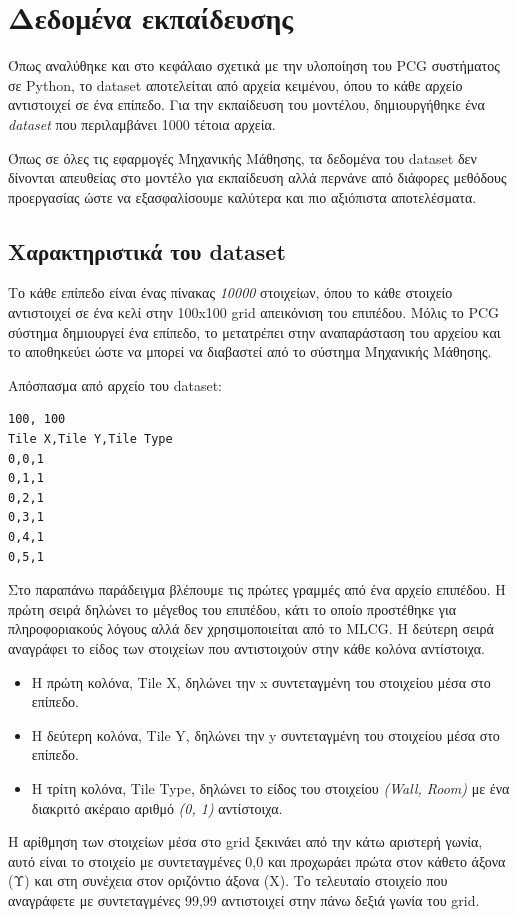 \section{Δεδομένα εκπαίδευσης}
Όπως αναλύθηκε και στο κεφάλαιο σχετικά με την υλοποίηση του PCG συστήματος σε Python, το dataset αποτελείται από αρχεία κειμένου, όπου το κάθε αρχείο αντιστοιχεί σε ένα επίπεδο. Για την εκπαίδευση του μοντέλου, δημιουργήθηκε ένα \textit{dataset} που περιλαμβάνει 1000 τέτοια αρχεία.
\par
Όπως σε όλες τις εφαρμογές Μηχανικής Μάθησης, τα δεδομένα του dataset δεν δίνονται απευθείας στο μοντέλο για εκπαίδευση αλλά περνάνε από διάφορες μεθόδους προεργασίας ώστε να εξασφαλίσουμε καλύτερα και πιο αξιόπιστα αποτελέσματα.


\subsection{Χαρακτηριστικά του dataset}
Το κάθε επίπεδο είναι ένας πίνακας \textit{10000} στοιχείων, όπου το κάθε στοιχείο αντιστοιχεί σε ένα κελί στην 100x100 grid απεικόνιση του επιπέδου. Μόλις το PCG σύστημα δημιουργεί ένα επίπεδο, το μετατρέπει στην αναπαράσταση του αρχείου και το αποθηκεύει ώστε να μπορεί να διαβαστεί από το σύστημα Μηχανικής Μάθησης.
\par
Απόσπασμα από αρχείο του dataset:
\begin{verbatim}
100, 100
Tile X,Tile Y,Tile Type
0,0,1
0,1,1
0,2,1
0,3,1
0,4,1
0,5,1
\end{verbatim}
Στο παραπάνω παράδειγμα βλέπουμε τις πρώτες γραμμές από ένα αρχείο επιπέδου. Η πρώτη σειρά δηλώνει το μέγεθος του επιπέδου, κάτι το οποίο προστέθηκε για πληροφοριακούς λόγους αλλά δεν χρησιμοποιείται από το MLCG. Η δεύτερη σειρά αναγράφει το είδος των στοιχείων που αντιστοιχούν στην κάθε κολόνα αντίστοιχα.
\par

\begin{itemize}
\item Η πρώτη κολόνα, Tile X, δηλώνει την x συντεταγμένη του στοιχείου μέσα στο επίπεδο.
\item Η δεύτερη κολόνα, Tile Y, δηλώνει την y συντεταγμένη του στοιχείου μέσα στο επίπεδο.
\item Η τρίτη κολόνα, Tile Type, δηλώνει το είδος του στοιχείου \textit{(Wall, Room)} με ένα διακριτό ακέραιο αριθμό \textit{(0, 1)} αντίστοιχα.
\end{itemize}

\par
H αρίθμηση των στοιχείων μέσα στο grid ξεκινάει από την κάτω αριστερή γωνία, αυτό είναι το στοιχείο με συντεταγμένες 0,0 και προχωράει πρώτα στον κάθετο άξονα (Υ) και στη συνέχεια στον οριζόντιο άξονα (Χ). Το τελευταίο στοιχείο που αναγράφετε με συντεταγμένες 99,99 αντιστοιχεί στην πάνω δεξιά γωνία του grid.

